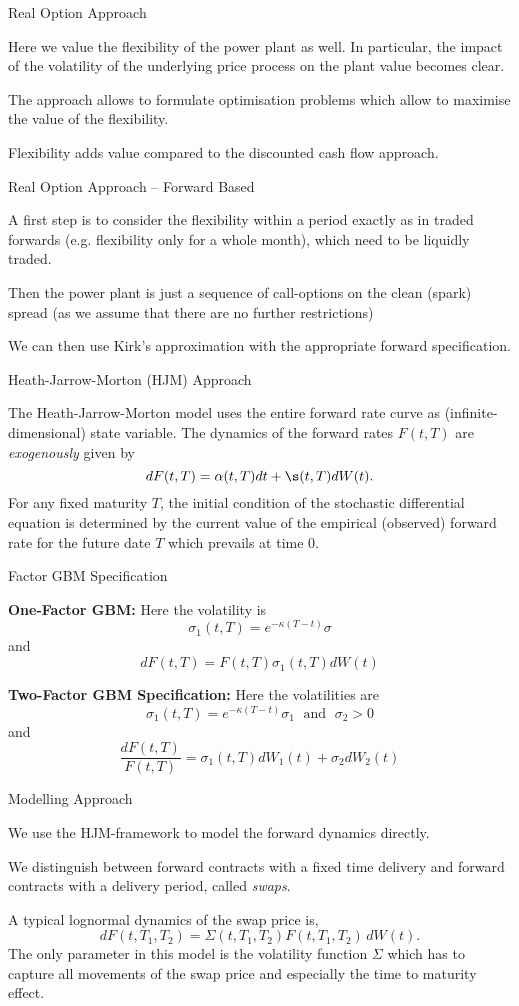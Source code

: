 {Real Option Approach}
\item<1-> Here we value the flexibility of the power plant as well. In particular, the impact of the volatility of the underlying price process on the plant value becomes clear.
\item<2-> The approach allows to formulate optimisation problems which allow to maximise the value of the flexibility.
\item<3-> Flexibility adds value compared to the discounted cash flow approach.

{Real Option Approach -- Forward Based}
\item<1-> A first step is to consider the flexibility within a period exactly as in traded forwards (e.g. flexibility only for a whole month), which need to be liquidly traded.
\item<2-> Then the power plant is just a sequence of call-options on the clean (spark) spread
(as we assume that there are no further restrictions)
\item<3-> We can then use Kirk's approximation with the appropriate forward specification.

{Heath-Jarrow-Morton (HJM) Approach}

The Heath-Jarrow-Morton model uses the entire forward rate curve as
(infinite-dimensional) state variable. The dynamics of the forward rates $F(t,T)$ are {\it exogenously} given by
$$
dF(t,T) = \alpha(t,T) dt + \s(t,T) dW(t).
$$
For any fixed maturity $T$, the
initial condition of the stochastic differential equation
is determined by the current value
of the empirical (observed) forward rate for the future date $T$
which prevails at time $0$.

{Factor GBM Specification}
\item<1-> {\bf One-Factor GBM:} Here the volatility is
$$
\sigma_1(t,T)=e^{-\kappa (T-t)}\sigma
$$
and
$$
dF(t,T)=F(t,T)\sigma_1(t,T)dW(t)
$$
\item<2->{\bf Two-Factor GBM Specification:}
Here the volatilities are
$$
\sigma_1(t,T)=e^{-\kappa (T-t)}\sigma_1 \; \mbox{ and } \; \sigma_2>0
$$
and
$$
\frac{dF(t,T)}{F(t,T)}=\sigma_1(t,T)dW_1(t)+\sigma_2dW_2(t)
$$

{Modelling Approach}
\item<1-> We use the HJM-framework to model the forward dynamics directly.
\item<2-> We distinguish between forward contracts with a fixed time delivery and forward contracts with a delivery period, called \emph{swaps}.
\item<3-> A typical lognormal dynamics of the swap price is,
\begin{equation}
dF(t,T_1,T_2)=\Sigma(t,T_1,T_2)F(t,T_1,T_2)\, dW(t). \label{eqn: lognormal dynamics}
\end{equation}
The only parameter in this model is the volatility function $\Sigma$ which has to capture all movements of the swap price and especially the time to maturity effect.

